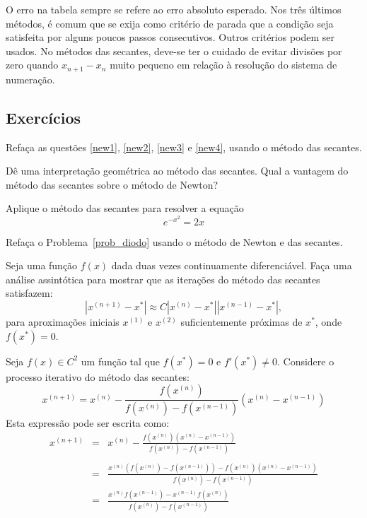 \begin{ex}
\begin{obs}
O erro na tabela sempre se refere ao erro absoluto esperado. Nos três últimos métodos, é comum que se exija como critério de parada que a condição seja satisfeita por alguns poucos passos consecutivos. Outros critérios podem ser usados. No métodos das secantes, deve-se ter o cuidado de evitar divisões por zero quando $x_{n+1}-x_n$ muito pequeno em relação à resolução do sistema de numeração.
\end{obs}

\subsection*{Exercícios}

\begin{exer} Refaça as questões \ref{new1}, \ref{new2}, \ref{new3}  e \ref{new4}, usando o método das secantes.
\end{exer}

\begin{exer} Dê uma interpretação geométrica ao método das secantes. Qual a vantagem do método das secantes sobre o método de Newton?
\end{exer}

\begin{exer} Aplique o método das secantes para resolver a equação
  \begin{equation}
    e^{-x^2}=2x
  \end{equation}
\end{exer}

\begin{exer} Refaça o Problema~\ref{prob_diodo} usando o método de Newton e das secantes.
\end{exer}

\begin{exer}
  Seja uma função $f(x)$ dada duas vezes continuamente diferenciável. Faça uma análise assintótica para mostrar que as iterações do método das secantes satisfazem:
  \begin{equation}
    |x^{(n+1)} - x^*| \approx C |x^{(n)} - x^*||x^{(n-1)} - x^*|,
  \end{equation}
para aproximações iniciais $x^{(1)}$ e $x^{(2)}$ suficientemente próximas de $x^*$, onde $f(x^*) = 0$.
\end{exer}
\begin{resp}
Seja $f(x)\in C^2$ um função tal que $f(x^*)=0$ e $f'(x^*)\neq 0$. Considere o processo iterativo do método das secantes:
\begin{equation} x^{(n+1)}=x^{(n)}- \frac{f(x^{(n)})}{f(x^{(n)})-f(x^{(n-1)})}(x^{(n)}-x^{(n-1)}) \end{equation}
Esta expressão pode ser escrita como:
\begin{eqnarray}
x^{(n+1)}&=&x^{(n)}- \frac{f(x^{(n)})(x^{(n)}-x^{(n-1)})}{f(x^{(n)})-f(x^{(n-1)})}\\~\\
 &=&\frac{x^{(n)}\left(f(x^{(n)})-f(x^{(n-1)})\right)-f(x^{(n)})(x^{(n)}-x^{(n-1)})}{f(x^{(n)})-f(x^{(n-1)})}\\
 &=&\frac{x^{(n)} f(x^{(n-1)})-x^{(n-1)}f(x^{(n)})}{f(x^{(n)})-f(x^{(n-1)})}
\end{eqnarray}


\end{resp}
\end{ex}
